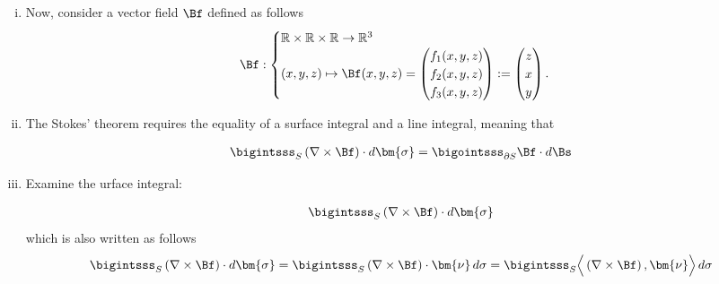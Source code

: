 \documentclass[12pt]{article}
\begin{document}
\begin{enumerate}[(i)]
	\item Now, consider a vector field $\Bf$ defined as follows
	      \begin{align}
		      \label{eq:vectorfieldf}
		      \Bf:
		      \begin{cases}
			      \mathbb{R}\times\mathbb{R}\times\mathbb{R} \to \mathbb{R}^3 \\
			      (x,y,z) \mapsto \Bf(x,y,z)
			      =
			      \begin{pmatrix}
				      f_{1}(x,y,z) \\ f_{2}(x,y,z) \\f_{3}(x,y,z)
			      \end{pmatrix}
			      :=
			      \begin{pmatrix}
				      z \\x\\y
			      \end{pmatrix}.
		      \end{cases}
	      \end{align}
	      
	\item The Stokes' theorem requires the equality of
	      a surface integral and a line integral, meaning that 
	      \begin{mdframed}
		      \begin{align}
			      \bigintsss_{S} \left( \nabla \times \Bf \right) \cdot d\bm{\sigma}
			      =
			      \bigointsss_{\partial S} \Bf \cdot d \Bs
		      \end{align}
	      \end{mdframed}
	      
	\item Examine the urface integral:
	      \begin{mdframed}
		      \begin{align}
			      \bigintsss_{S} \left( \nabla \times \Bf \right) \cdot d\bm{\sigma}
		      \end{align}
		      which is also written as follows 
		      \begin{align}
			      \label{eq:surfacsimilar}
			      \bigintsss_{S} \left( \nabla \times \Bf \right) \cdot d\bm{\sigma}
			      = 
			      \bigintsss_{S} \left( \nabla \times \Bf \right) \cdot \bm{\nu} \, d\sigma
			      =
			      \bigintsss_{S} \Big\langle \left( \nabla \times \Bf \right), \bm{\nu} \Big\rangle \, d\sigma
		      \end{align}
	      \end{mdframed}
	      

\end{enumerate}
\end{document}
